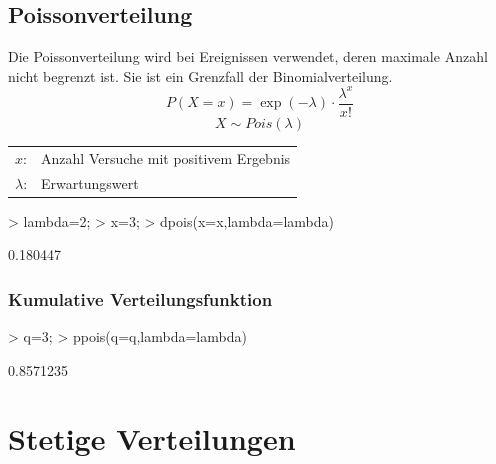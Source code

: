\subsection{Poissonverteilung}
Die Poissonverteilung wird bei Ereignissen verwendet, deren maximale Anzahl 
nicht begrenzt ist. Sie ist ein Grenzfall der Binomialverteilung. 
\[ P(X=x) = \exp(-\lambda) \cdot \frac{\lambda^x}{x!} \]
\[ X \sim Pois(\lambda) \]
\begin{tabular}{@{}ll}
  $x$: & Anzahl Versuche mit positivem Ergebnis \\
  $\lambda$: & Erwartungswert
\end{tabular} 
\begin{Schunk}
\begin{Sinput}
> lambda=2;
> x=3;
> dpois(x=x,lambda=lambda)
\end{Sinput}
\begin{Soutput}
[1] 0.180447
\end{Soutput}
\end{Schunk}

\subsubsection{Kumulative Verteilungsfunktion}
\begin{Schunk}
\begin{Sinput}
> q=3;
> ppois(q=q,lambda=lambda)
\end{Sinput}
\begin{Soutput}
[1] 0.8571235
\end{Soutput}
\end{Schunk}

\section{Stetige Verteilungen}

